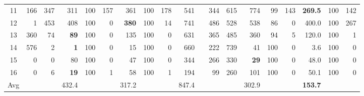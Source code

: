 \documentclass[authoryear,preprint,a4paper,12pt]{elsarticle}
\begin{document}
\begin{sidewaystable}
{\begin{tabular}{|c|r|r|rrr|rrr|rrr|r|rrr|rrr|}
11 & 166 & 347 & 311 & 100 & 157 & 361 & 100 & 178 & 541 &  & 344 & 615 & 774 & 99 & 143 & \textbf{269.5} & 100 & 142 \\ 
12 & 1 & 453 & 408 & 100 & 0 & \textbf{380} & 100 & 14 & 741 &  & 486 & 528 & 538 & 86 & 0 & 400.0 & 100 & 267 \\ 
13 & 360 & 74 & \textbf{89} & 100 & 0 & 135 & 100 & 0 & 631 &  & 365 & 485 & 360 & 94 & 5 & 120.0 & 100 & 1 \\ 
14 & 576 & 2 & \textbf{1} & 100 & 0 & 15 & 100 & 0 & 660 &  & 222 & 739 & 41 & 100 & 0 & 3.6 & 100 & 0 \\ 
15 & 0 & 0 & 80 & 100 & 0 & 47 & 100 & 0 & 344 &  & 266 & 330 & \textbf{29} & 100 & 0 & 48.0 & 100 & 0 \\ 
16 & 0 & 6 & \textbf{19} & 100 & 1 & 58 & 100 & 1 & 194 &  & 99 & 260 & 101 & 100 & 0 & 50.1 & 100 & 0 \\ \hline
Avg &  &  & 432.4 &  &  & 317.2 &  &  & 847.4 &  &  &  & 302.9 &  &  & \textbf{153.7} &  &  \\ \hline
\end{tabular}
}



\end{sidewaystable}
\end{document}
